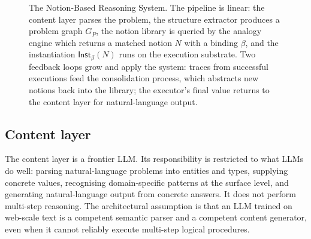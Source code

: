 \documentclass[11pt,a4paper]{article}
\theoremstyle{plain}
\theoremstyle{definition}
\theoremstyle{remark}
\newcommand{\GSRE}{\textsc{Gsre}}
\newcommand{\Inst}{\mathsf{Inst}}
\begin{document}
\begin{figure}[ht]
\centering
{}
\caption{The Notion-Based Reasoning System. The pipeline is linear: the content layer parses the problem, the structure extractor produces a problem graph $G_P$, the notion library is queried by the analogy engine which returns a matched notion $N$ with a binding $\beta$, and the instantiation $\Inst_\beta(N)$ runs on the execution substrate. Two feedback loops grow and apply the system: traces from successful executions feed the consolidation process, which abstracts new notions back into the library; the executor's final value returns to the content layer for natural-language output.}
\label{fig:nbrs}
\end{figure}

\subsection{Content layer}

The content layer is a frontier LLM. Its responsibility is restricted to what LLMs do well: parsing natural-language problems into entities and types, supplying concrete values, recognising domain-specific patterns at the surface level, and generating natural-language output from concrete answers. It does not perform multi-step reasoning. The architectural assumption is that an LLM trained on web-scale text is a competent semantic parser and a competent content generator, even when it cannot reliably execute multi-step logical procedures.
\end{document}

